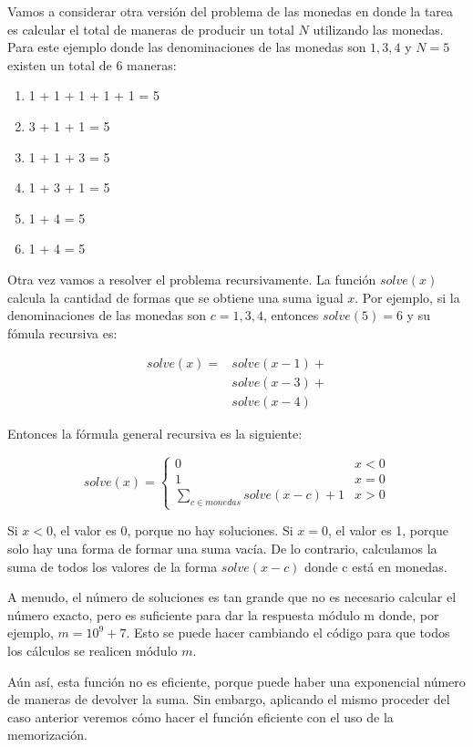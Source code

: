 Vamos a considerar otra versión del problema de las monedas en donde la tarea es calcular el total de maneras de producir un total $N$ utilizando las monedas. Para este ejemplo donde las denominaciones de las monedas son ${1,3,4}$ y $N=5$ existen un total de 6 maneras:
\begin{enumerate}
	\item 1 + 1 + 1 + 1 + 1 = 5
	\item 3 + 1 + 1 = 5
	\item 1 + 1 + 3 = 5
	\item 1 + 3 + 1 = 5
	\item 1 + 4 = 5
	\item 1 + 4 = 5 
\end{enumerate}

Otra vez vamos a resolver el  problema recursivamente. La función $solve(x)$ calcula la cantidad de formas que se obtiene una suma igual $x$. Por ejemplo, si la denominaciones de las monedas son $c={1,3,4}$, entonces $solve(5)=6$ y su fómula recursiva es:

$$\begin{matrix}
	solve(x) = & solve(x-1)+ \\
	& solve(x-3)+ \\
	& solve(x-4)
\end{matrix}$$

Entonces la fórmula general recursiva es la siguiente:

$$solve(x) = \begin{cases}
	0 & x<0 \\ 
	1 & x=0 \\
	\sum_{c \in monedas} solve(x-c)+1 & x>0 
\end{cases}$$

Si $x < 0$, el valor es 0, porque no hay soluciones. Si $x = 0$, el valor es 1, porque solo hay una forma de formar una suma vacía. De lo contrario, calculamos la suma de todos los valores de la forma $solve(x-c)$ donde c está en monedas.

A menudo, el número de soluciones es tan grande que no es necesario calcular el número exacto, pero es suficiente para dar la respuesta módulo m donde, por ejemplo, $m = 10^9 + 7$. Esto se puede hacer cambiando el código para que todos los cálculos se realicen módulo $m$.

Aún así, esta función no es eficiente, porque puede haber una exponencial
número de maneras de devolver la suma. Sin embargo, aplicando el mismo proceder del caso anterior veremos cómo hacer el función eficiente con el uso de la memorización. 

